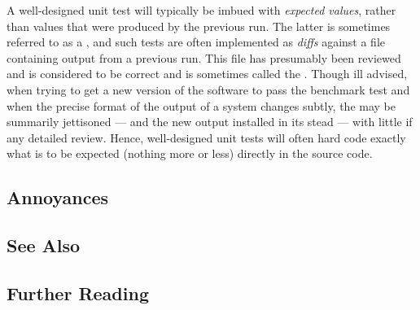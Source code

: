 A
well-designed unit test will typically be imbued with \emph{expected
values}, rather than values that were produced by the previous run.
The latter is sometimes referred to as a , and such tests are often implemented as \emph{diffs} against
a file containing output from a previous run. This file has
presumably been reviewed and is considered to be correct and is sometimes called the . Though ill advised, when trying to get a new version of the software to pass the benchmark test and when the precise format of the output of a system
changes subtly, the  may be summarily jettisoned --- and the new
output installed in its stead --- with little if any detailed review.
Hence, well-designed unit tests will often hard code exactly what is
to be expected (nothing more or less) directly in the
   source code.

\subsection[Annoyances]{Annoyances}\label{annoyances}

\hspace*{\fill}

\subsection[See Also]{See Also}\label{see-also}

\hspace*{\fill}

\subsection[Further Reading]{Further Reading}\label{further-reading}

\hspace*{\fill}


